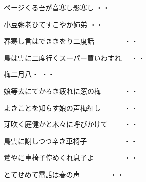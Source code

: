 \vspace{0.4cm}
\begin{shiika}ページくる吾が音寒し影寒し
\hfill{・・}\end{shiika}
\vspace{0.4cm}
\begin{shiika}小豆粥老ひてすこやか姉弟
\hfill{・・}\end{shiika}
\vspace{0.4cm}
\begin{shiika}春寒し言はでききをり二度話　　　　
\hfill{・・}\end{shiika}
\vspace{0.4cm}
\begin{shiika}鳥は雲に二度行くスーパー買いわすれ　
\hfill{・・}\end{shiika}
\vspace{0.4cm}
\begin{shiika}梅二月八・
\hfill{・・}\end{shiika}
\vspace{0.4cm}
\begin{shiika}娘等去にてかろき疲れに窓の梅　　　
\hfill{・・}\end{shiika}
\vspace{0.4cm}
\begin{shiika}よきことを知らす娘の声梅紅し　　　
\hfill{・・}\end{shiika}
\vspace{0.4cm}
\begin{shiika}芽吹く庭健かと木々に呼びかけて　　
\hfill{・・}\end{shiika}
\vspace{0.4cm}
\begin{shiika}鳥雲に謝しつつ辛き車椅子　　　　　
\hfill{・・}\end{shiika}
\vspace{0.4cm}
\begin{shiika}鶯やに車椅子停めくれ息子よ　　　　
\hfill{・・}\end{shiika}
\vspace{0.4cm}
\begin{shiika}とてせめて電話は春の声　　　　
\hfill{・・}\end{shiika}
